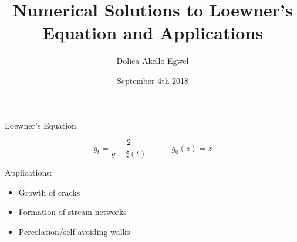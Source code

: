 \documentclass{beamer}
\title[]{Numerical Solutions to Loewner's Equation and Applications}
\author{Dolica Akello-Egwel}
\date{September 4th 2018}
\begin{document}
\begin{frame}
\titlepage
\end{frame}

\begin{frame}{Loewner's Equation}

\begin{adjustbox}{max totalsize={.9\textwidth}{.7\textheight},center}

\end{adjustbox}

$$g_t = \frac{2}{g - \xi(t)} \quad\quad\quad g_0(z) = z$$

Applications:
\begin{itemize}
\item Growth of cracks
\item Formation of stream networks
\item Percolation/self-avoiding walks
\end{itemize}

\end{frame}
\end{document}
